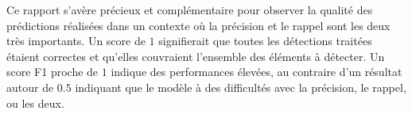 Ce rapport s'avère précieux et complémentaire pour observer la qualité des prédictions réalisées dans un contexte où la précision et le rappel sont les deux très importants. Un score de $1$ signifierait que toutes les détections traitées étaient correctes et qu'elles couvraient l'ensemble des éléments à détecter. Un score F1 proche de $1$ indique des performances élevées, au contraire d'un résultat autour de $0.5$ indiquant que le modèle à des difficultés avec la précision, le rappel, ou les deux.


